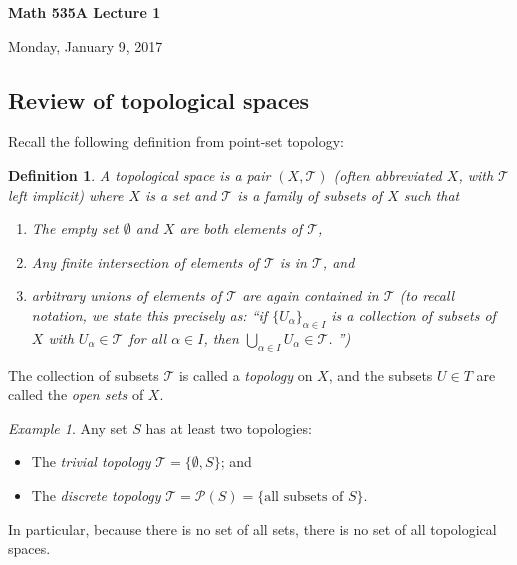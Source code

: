 \documentclass[11pt]{article}
\newtheorem{defn}{Definition}
\theoremstyle{remark}
\newtheorem{ex}{Example}
\def\T{\mathcal{T}}
\begin{document}
\begin{center}
    \begin{Large} {\bf Math 535A Lecture 1}\\
    \end{Large}
    Monday, January 9, 2017
\end{center}

\subsection*{Review of topological spaces}
Recall the following definition from point-set topology:
\begin{defn} A {\em topological space} is a pair $(X, \T)$ (often abbreviated $X$, with $\T$ left implicit) where $X$ is a set and $\T$ is a family of subsets of $X$ such that
    \begin{enumerate}
        \item The empty set $\emptyset$ and $X$ are both elements of $\T$,
        \item Any finite intersection of elements of $\T$ is in $\T$, and

        \item arbitrary unions of elements of $\T$ are again contained in $\T$
            (to recall notation, we state this precisely as: ``if
            $\{U_{\alpha}\}_{\alpha \in I}$ is a collection of subsets of $X$
            with $U_{\alpha} \in \T$ for all $\alpha \in I$, then
            $\bigcup_{\alpha \in I} U_{\alpha} \in \T$. '')
    \end{enumerate}
\end{defn}
The collection of subsets $\T$ is called a {\em topology} on $X$, and
the subsets $U \in T$ are called the {\em open sets} of $X$.
\begin{ex}
    Any set $S$ has at least two topologies:
    \begin{itemize}
        \item The {\em trivial topology} $\T = \{\emptyset, S\}$; and
        \item The {\em discrete topology} $\T = \mathcal{P}(S) = \{\textrm{all subsets of }S\}$.
    \end{itemize}
    In particular, because there is no set of all sets, there is no set of all topological spaces.
\end{ex}
\end{document}

